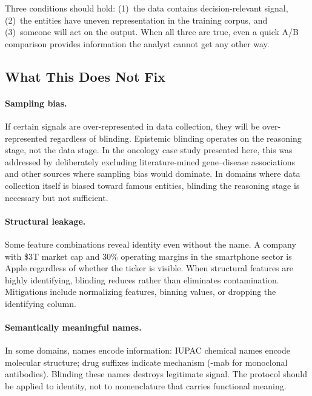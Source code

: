 \documentclass[sigconf, nonacm]{acmart}
\begin{document}
Three conditions should hold: (1)~the data contains decision-relevant signal, (2)~the entities have uneven representation in the training corpus, and (3)~someone will act on the output. When all three are true, even a quick A/B comparison provides information the analyst cannot get any other way.

\subsection{What This Does Not Fix}

\paragraph{Sampling bias.} If certain signals are over-represented in data collection, they will be over-represented regardless of blinding. Epistemic blinding operates on the reasoning stage, not the data stage. In the oncology case study presented here, this was addressed by deliberately excluding literature-mined gene--disease associations and other sources where sampling bias would dominate. In domains where data collection itself is biased toward famous entities, blinding the reasoning stage is necessary but not sufficient.

\paragraph{Structural leakage.} Some feature combinations reveal identity even without the name. A company with \$3T market cap and 30\% operating margins in the smartphone sector is Apple regardless of whether the ticker is visible. When structural features are highly identifying, blinding reduces rather than eliminates contamination. Mitigations include normalizing features, binning values, or dropping the identifying column.

\paragraph{Semantically meaningful names.} In some domains, names encode information: IUPAC chemical names encode molecular structure; drug suffixes indicate mechanism (-mab for monoclonal antibodies). Blinding these names destroys legitimate signal. The protocol should be applied to identity, not to nomenclature that carries functional meaning.

\end{document}
